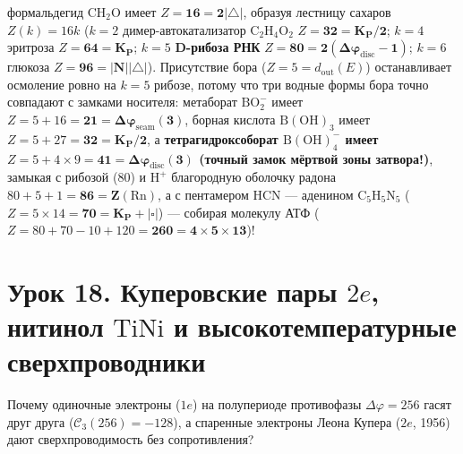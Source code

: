 \begin{enumerate}[label=\textbf{\arabic*.},leftmargin=*]
\begin{itemize}[noitemsep]
    формальдегид $\mathrm{CH_2O}$ имеет $Z = \mathbf{16 = 2|{\triangle}|}$, образуя лестницу сахаров $Z(k) = 16k$ ($k=2$ димер-автокатализатор $\mathrm{C_2H_4O_2}$ $Z = \mathbf{32 = K_P/2}$; $k=4$ эритроза $Z = \mathbf{64 = K_P}$; $k=5$ \textbf{D-рибоза РНК} $Z = \mathbf{80 = 2(\Delta\varphi_{\mathrm{disc}}-1)}$; $k=6$ глюкоза $Z = \mathbf{96 = |N||{\triangle}|}$). Присутствие бора ($Z=5=d_{\mathrm{out}}(E)$) останавливает осмоление ровно на $k=5$ рибозе, потому что три водные формы бора точно совпадают с замками носителя: метаборат $\mathrm{BO_2^-}$ имеет $Z = 5+16 = \mathbf{21 = \Delta\varphi_{\mathrm{seam}}(3)}$, борная кислота $\mathrm{B(OH)_3}$ имеет $Z = 5+27 = \mathbf{32 = K_P/2}$, а \textbf{тетрагидроксоборат $\mathrm{B(OH)_4^-}$ имеет $Z = 5 + 4\times 9 = \mathbf{41 = \Delta\varphi_{\mathrm{disc}}(3)}$ (точный замок мёртвой зоны затвора!)}, замыкая с рибозой ($80$) и $\mathrm{H^+}$ благородную оболочку радона $80 + 5 + 1 = \mathbf{86 = Z(\mathrm{Rn})}$, а с пентамером $\mathrm{HCN}$ --- аденином $\mathrm{C_5H_5N_5}$ ($Z = 5\times 14 = \mathbf{70 = K_P+|\square|}$) --- собирая молекулу АТФ ($Z = 80 + 70 - 10 + 120 = \mathbf{260 = 4\times 5\times 13}$)!
  \end{itemize}
\end{enumerate}

\section{Урок 18. Куперовские пары \texorpdfstring{$2e$}{2e}, нитинол \texorpdfstring{$\mathrm{TiNi}$}{TiNi} и высокотемпературные сверхпроводники}

Почему одиночные электроны ($1e$) на полупериоде противофазы $\Delta\varphi = 256$ гасят друг друга ($\mathcal{C}_3(256) = -128$), а спаренные электроны Леона Купера ($2e$, 1956) дают сверхпроводимость без сопротивления?


